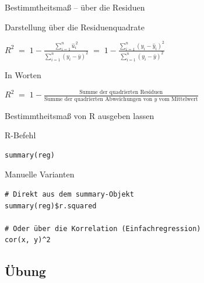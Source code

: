 \documentclass[aspectratio=169,11pt]{beamer}
\begin{document}
\begin{frame}{Bestimmtheitsmaß -- über die Residuen}
  \begin{exampleblock}{Darstellung über die Residuenquadrate}
    \begin{center}
      $\displaystyle
        R^{2} \;=\; 1 - \frac{\sum_{i=1}^{n} \hat{u}_i^{\,2}}
                              {\sum_{i=1}^{n}(y_i - \bar{y})^{2}}
        \;=\; 1 - \frac{\sum_{i=1}^{n}(y_i - \hat{y}_i)^{2}}
                        {\sum_{i=1}^{n}(y_i - \bar{y})^{2}}$
    \end{center}
  \end{exampleblock}

  \begin{block}{In Worten}
    \begin{center}
      $\displaystyle
        R^{2} \;=\; 1 - \frac{\text{Summe der quadrierten Residuen}}
        {\text{Summe der quadrierten Abweichungen von $y$ vom Mittelwert}}$
    \end{center}
  \end{block}
\end{frame}

\begin{frame}[fragile]{Bestimmtheitsmaß von R ausgeben lassen}
  \begin{block}{R-Befehl}
\begin{lstlisting}
summary(reg)
\end{lstlisting}
  \end{block}

  \begin{exampleblock}{Manuelle Varianten}
\begin{lstlisting}
# Direkt aus dem summary-Objekt
summary(reg)$r.squared

# Oder über die Korrelation (Einfachregression)
cor(x, y)^2
\end{lstlisting}
  \end{exampleblock}
\end{frame}


\subsection*{Übung}
\end{document}
